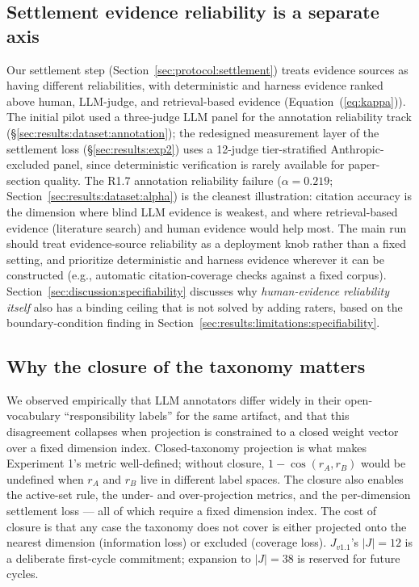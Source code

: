 \subsection{Settlement evidence reliability is a separate axis}
\label{sec:discussion:evidence}

Our settlement step (Section~\ref{sec:protocol:settlement}) treats evidence sources as having different reliabilities, with deterministic and harness evidence ranked above human, LLM-judge, and retrieval-based evidence (Equation~(\ref{eq:kappa})). The initial pilot used a three-judge LLM panel for the annotation reliability track (\S\ref{sec:results:dataset:annotation}); the redesigned measurement layer of the settlement loss (\S\ref{sec:results:exp2}) uses a 12-judge tier-stratified Anthropic-excluded panel, since deterministic verification is rarely available for paper-section quality. The R1.7 annotation reliability failure ($\alpha = 0.219$; Section~\ref{sec:results:dataset:alpha}) is the cleanest illustration: citation accuracy is the dimension where blind LLM evidence is weakest, and where retrieval-based evidence (literature search) and human evidence would help most. The main run should treat evidence-source reliability as a deployment knob rather than a fixed setting, and prioritize deterministic and harness evidence wherever it can be constructed (e.g., automatic citation-coverage checks against a fixed corpus). Section~\ref{sec:discussion:specifiability} discusses why \emph{human-evidence reliability itself} also has a binding ceiling that is not solved by adding raters, based on the boundary-condition finding in Section~\ref{sec:results:limitations:specifiability}.

\subsection{Why the closure of the taxonomy matters}
\label{sec:discussion:closure}

We observed empirically that LLM annotators differ widely in their open-vocabulary ``responsibility labels'' for the same artifact, and that this disagreement collapses when projection is constrained to a closed weight vector over a fixed dimension index. Closed-taxonomy projection is what makes Experiment 1's metric well-defined; without closure, $1 - \cos(r_A, r_B)$ would be undefined when $r_A$ and $r_B$ live in different label spaces. The closure also enables the active-set rule, the under- and over-projection metrics, and the per-dimension settlement loss --- all of which require a fixed dimension index. The cost of closure is that any case the taxonomy does not cover is either projected onto the nearest dimension (information loss) or excluded (coverage loss). $J_{v1.1}$'s $|J| = 12$ is a deliberate first-cycle commitment; expansion to $|J| = 38$ is reserved for future cycles.

